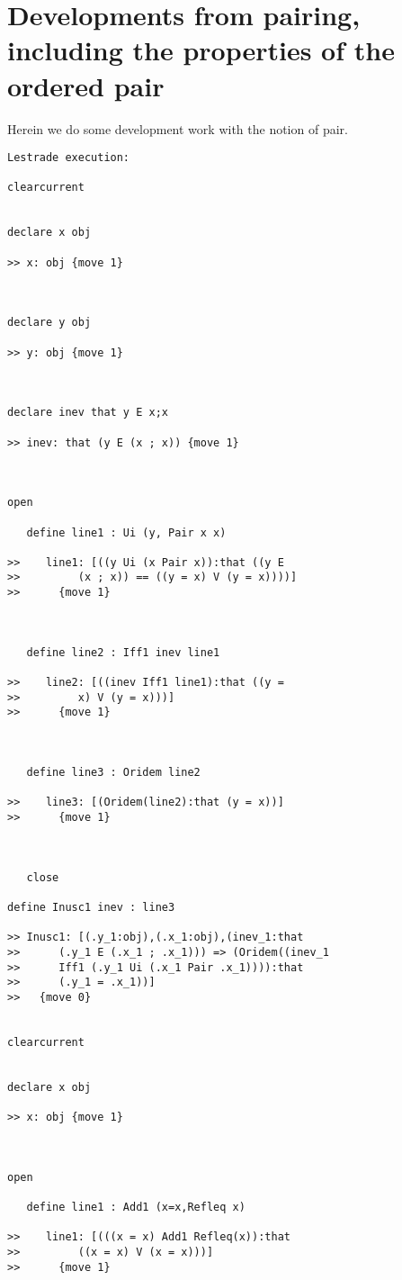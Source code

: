 \documentclass[12pt]{article}
\begin{document}
\section{Developments from pairing, including the properties of the ordered pair}

Herein we do some development work with the notion of pair.

\begin{verbatim}Lestrade execution:

clearcurrent


declare x obj

>> x: obj {move 1}



declare y obj

>> y: obj {move 1}



declare inev that y E x;x

>> inev: that (y E (x ; x)) {move 1}



open

   define line1 : Ui (y, Pair x x)

>>    line1: [((y Ui (x Pair x)):that ((y E
>>         (x ; x)) == ((y = x) V (y = x))))]
>>      {move 1}



   define line2 : Iff1 inev line1

>>    line2: [((inev Iff1 line1):that ((y =
>>         x) V (y = x)))]
>>      {move 1}



   define line3 : Oridem line2

>>    line3: [(Oridem(line2):that (y = x))]
>>      {move 1}



   close

define Inusc1 inev : line3

>> Inusc1: [(.y_1:obj),(.x_1:obj),(inev_1:that
>>      (.y_1 E (.x_1 ; .x_1))) => (Oridem((inev_1
>>      Iff1 (.y_1 Ui (.x_1 Pair .x_1)))):that
>>      (.y_1 = .x_1))]
>>   {move 0}


clearcurrent


declare x obj

>> x: obj {move 1}



open

   define line1 : Add1 (x=x,Refleq x)

>>    line1: [(((x = x) Add1 Refleq(x)):that
>>         ((x = x) V (x = x)))]
>>      {move 1}




\end{verbatim}
\end{document}
